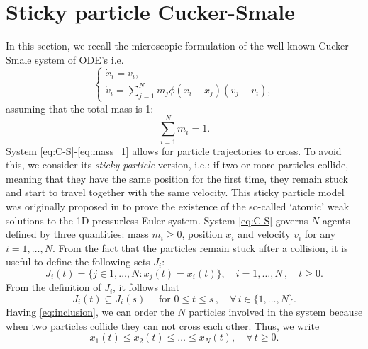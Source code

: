 \documentclass[11pt,a4paper,oneside]{amsart}
\begin{document}
\section{Sticky particle Cucker-Smale}\label{Sec:2}
\setcounter{equation}{0}
In this section, we recall the microscopic formulation of the well-known Cucker-Smale system of ODE's 
\cite{Cucker2007} i.e.
\begin{equation}\label{eq:C-S}
\begin{cases}
\dot x_i=v_i,\\
\dot v_i=\displaystyle{\sum_{j=1}^N} m_j\phi(x_i-x_j)(v_j-v_i),
\end{cases}
\end{equation}
assuming that the total mass is 1:
\begin{equation}\label{eq:mass_1}
\sum_{i=1}^N m_i=1.
\end{equation}
System \eqref{eq:C-S}-\eqref{eq:mass_1} allows for particle trajectories to cross. 
To avoid this, we consider its \textit{sticky particle} version, i.e.: if two or more particles collide, meaning that they have the same position 
for the first time, they remain stuck and start to travel together with the same velocity. 
%
This sticky particle model was originally proposed in \cite{Zeldovich70, Grenier1995ExistenceGP} 
to prove the existence of the so-called `atomic' weak solutions to the 1D pressurless Euler system.
System \eqref{eq:C-S} governs $N$ agents defined by three quantities: mass $m_i \geq 0$,  position $x_i$ 
and velocity $v_i$ for any $i=1,\dots,N$.
\newline
From the fact that the particles remain stuck after a collision, it is useful to define the following sets $J_i$:
\begin{equation*}
    J_i(t)=\{j\in 1,\dots, N: x_j(t)=x_i(t)\},\quad i=1,\dots,N\,,\quad t\ge 0.
\end{equation*}
From the definition of $J_i$, it follows that 
\begin{equation}\label{eq:inclusion}
    J_i(t)\subseteq J_i(s) \quad \mbox{ for } 
    0\le t\le s\,,\quad \forall\, i\in\{1,\dots,N\}.
\end{equation}
Having \eqref{eq:inclusion}, we can order the $N$ particles involved in the system because when two particles collide 
they can not cross each other. Thus, we write
\begin{equation}\label{eq:particle-do-not-cross}
    x_1(t)\leq x_2(t)\leq\dots\leq x_N(t),\quad\forall \,t\geq0.
\end{equation}
\end{document}
